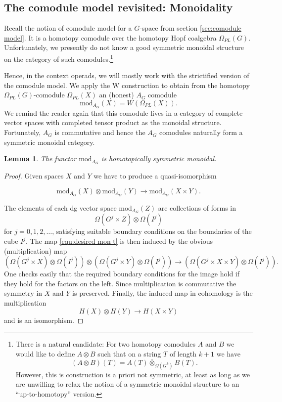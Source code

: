 \documentclass[a4paper]{amsart}
\theoremstyle{plain}
\newtheorem{lemma}[thm]{Lemma}
\theoremstyle{definition}
\renewcommand{\mod}{\mathrm{mod}}
\newcommand{\beq}[1]{
\begin{equation}\label{#1}
}
\newcommand{\eeq}{
\end{equation}
}
\begin{document}
\subsection{The comodule model revisited: Monoidality}
Recall the notion of comodule model for a $G$-space from section \ref{sec:comodule model}.
It is a homotopy comodule over the homotopy Hopf coalgebra $\Omega_{PL}(G)$.
Unfortunately, we presently do not know a good symmetric monoidal structure on the category of such comodules.\footnote{There is a natural candidate: For two homotopy comodules $A$ and $B$ we would like to define $A\otimes B$ such that on a string $T$ of length $k+1$ we have 
\[
 (A\otimes B)(T)= A(T) \bar \otimes_{\Omega(G^k)} B(T).
\]
However, this is construction is a priori not symmetric, at least as long as we are unwilling to relax the notion of a symmetric monoidal structure to an ``up-to-homotopy'' version.}

Hence, in the context operads, we will mostly work with the strictified version of the comodule model.
We apply the W construction to obtain from the homotopy $\Omega_{PL}(G)$-comodule $\Omega_{PL}(X)$ an (honest) $A_G$ comodule 
\[
 \mod_{A_G}(X) = W(\Omega_{PL}(X)).
\]
We remind the reader again that this comodule lives in a category of complete vector spaces with completed tensor product as the monoidal structure.
Fortunately, $A_G$ is commutative and hence the $A_G$ comodules naturally form a symmetric monoidal category.

\begin{lemma}
 The functor $\mod_{A_G}$ is homotopically symmetric monoidal.
\end{lemma}
\begin{proof}
 Given spaces $X$ and $Y$ we have to produce a quasi-isomorphism 
\beq{equ:desired mon t}
 \mod_{A_G}(X)\otimes \mod_{A_G}( Y) \to \mod_{A_G}(X\times Y).
\eeq
The elements of each dg vector space $\mod_{A_G}(Z)$ are collections of forms in 
\[
 \Omega(G^j\times Z) \otimes \Omega(I^j)
\]
for $j=0,1,2,\dots$, satisfying suitable boundary conditions on the boundaries of the cube $I^j$.
The map \eqref{equ:desired mon t} is then induced by the obvious (multiplication) map
\[
 \left( \Omega(G^j\times X) \otimes \Omega(I^j) \right)\otimes\left( \Omega(G^j\times Y) \otimes \Omega(I^j) \right)
\to 
\left( \Omega(G^j\times X\times Y) \otimes \Omega(I^j) \right).
\]
One checks easily that the required boundary conditions for the image hold if they hold for the factors on the left.
Since multiplication is commutative the symmetry in $X$ and $Y$ is preserved.
Finally, the induced map in cohomology is the multiplication
\[
 H(X)\otimes H(Y) \to H(X\times Y)
\]
and is an isomorphism. 
\end{proof}
\end{document}
